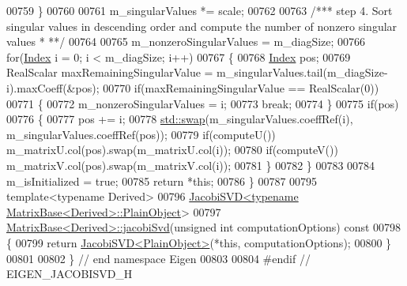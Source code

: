\begin{DoxyCode}
00759   \}
00760   
00761   m\_singularValues *= scale;
00762 
00763   \textcolor{comment}{/*** step 4. Sort singular values in descending order and compute the number of nonzero singular values *
      **/}
00764 
00765   m\_nonzeroSingularValues = m\_diagSize;
00766   \textcolor{keywordflow}{for}(\hyperlink{group___s_v_d___module_a6229a37997eca1072b52cca5ee7a2bec}{Index} i = 0; i < m\_diagSize; i++)
00767   \{
00768     \hyperlink{group___s_v_d___module_a6229a37997eca1072b52cca5ee7a2bec}{Index} pos;
00769     RealScalar maxRemainingSingularValue = m\_singularValues.tail(m\_diagSize-i).maxCoeff(&pos);
00770     \textcolor{keywordflow}{if}(maxRemainingSingularValue == RealScalar(0))
00771     \{
00772       m\_nonzeroSingularValues = i;
00773       \textcolor{keywordflow}{break};
00774     \}
00775     \textcolor{keywordflow}{if}(pos)
00776     \{
00777       pos += i;
00778       \hyperlink{endian_8c_a3ca5ecd34b04d6a243c054ac3a57f68d}{std::swap}(m\_singularValues.coeffRef(i), m\_singularValues.coeffRef(pos));
00779       \textcolor{keywordflow}{if}(computeU()) m\_matrixU.col(pos).swap(m\_matrixU.col(i));
00780       \textcolor{keywordflow}{if}(computeV()) m\_matrixV.col(pos).swap(m\_matrixV.col(i));
00781     \}
00782   \}
00783 
00784   m\_isInitialized = \textcolor{keyword}{true};
00785   \textcolor{keywordflow}{return} *\textcolor{keyword}{this};
00786 \}
00787 
00795 \textcolor{keyword}{template}<\textcolor{keyword}{typename} Derived>
00796 \hyperlink{group___s_v_d___module_class_eigen_1_1_jacobi_s_v_d}{JacobiSVD<typename MatrixBase<Derived>::PlainObject}>
00797 \hyperlink{group___core___module_a5745dca9c54390633b434e54a1d1eedd}{MatrixBase<Derived>::jacobiSvd}(\textcolor{keywordtype}{unsigned} \textcolor{keywordtype}{int} computationOptions)\textcolor{keyword}{ const}
00798 \textcolor{keyword}{}\{
00799   \textcolor{keywordflow}{return} \hyperlink{group___s_v_d___module_class_eigen_1_1_jacobi_s_v_d}{JacobiSVD<PlainObject>}(*\textcolor{keyword}{this}, computationOptions);
00800 \}
00801 
00802 \} \textcolor{comment}{// end namespace Eigen}
00803 
00804 \textcolor{preprocessor}{#endif // EIGEN\_JACOBISVD\_H}
\end{DoxyCode}
